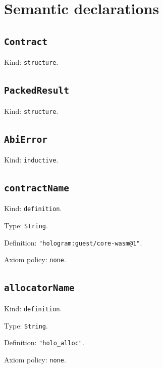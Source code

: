 \documentclass[11pt]{article}
\begin{document}
\section*{Semantic declarations}
\subsection*{\texttt{Contract}}
\noindent Kind: \texttt{structure}.\par
\subsection*{\texttt{PackedResult}}
\noindent Kind: \texttt{structure}.\par
\subsection*{\texttt{AbiError}}
\noindent Kind: \texttt{inductive}.\par
\subsection*{\texttt{contractName}}
\noindent Kind: \texttt{definition}.\par
\noindent Type: \texttt{String}.\par
\noindent Definition: \texttt{"hologram:guest/core-wasm@1"}.\par
\noindent Axiom policy: \texttt{none}.\par
\subsection*{\texttt{allocatorName}}
\noindent Kind: \texttt{definition}.\par
\noindent Type: \texttt{String}.\par
\noindent Definition: \texttt{"holo\_alloc"}.\par
\noindent Axiom policy: \texttt{none}.\par
\end{document}

